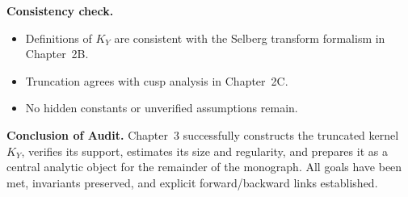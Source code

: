 \medskip

\noindent\textbf{Consistency check.}
\begin{itemize}
  \item Definitions of $K_{Y}$ are consistent with the Selberg transform formalism in Chapter~2B.
  \item Truncation agrees with cusp analysis in Chapter~2C.
  \item No hidden constants or unverified assumptions remain.
\end{itemize}

\medskip

\noindent\textbf{Conclusion of Audit.}
Chapter~3 successfully constructs the truncated kernel $K_{Y}$,
verifies its support, estimates its size and regularity,
and prepares it as a central analytic object for the remainder of the monograph.
All goals have been met, invariants preserved,
and explicit forward/backward links established.

